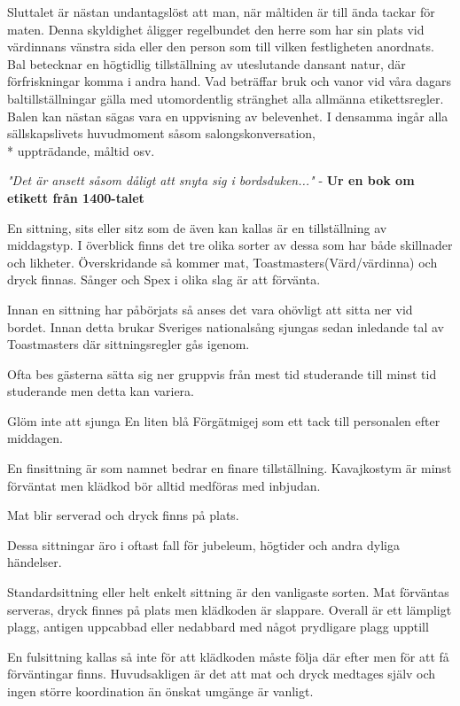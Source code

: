Sluttalet är nästan undantagslöst att man, när måltiden är till ända tackar för maten. Denna skyldighet åligger regelbundet den herre som har sin plats vid värdinnans vänstra sida eller den person som till vilken festligheten anordnats.
\filbreak
{}
Bal betecknar en högtidlig tillställning av uteslutande dansant natur, där förfriskningar komma i andra hand. Vad beträffar bruk och vanor vid våra dagars baltillställningar gälla med utomordentlig stränghet alla allmänna etikettsregler. Balen kan nästan sägas vara en uppvisning av belevenhet. I densamma ingår alla sällskapslivets huvudmoment såsom salongskonversation,\\* uppträdande, måltid osv.

\textit{"Det är ansett såsom dåligt att snyta sig i bordsduken..."} - \textbf{Ur en bok om etikett från 1400-talet}
\filbreak
{}

En sittning, sits eller sitz som de även kan kallas är en tillställning av middagstyp. I överblick finns det tre olika sorter av dessa som har både skillnader och likheter. Överskridande så kommer mat, Toastmasters(Värd/värdinna) och dryck finnas. Sånger och Spex i olika slag är att förvänta.

Innan en sittning har påbörjats så anses det vara ohövligt att sitta ner vid bordet. Innan detta brukar Sveriges nationalsång sjungas sedan inledande tal av Toastmasters där sittningsregler gås igenom.

Ofta bes gästerna sätta sig ner gruppvis från mest tid studerande till minst tid studerande men detta kan variera.

Glöm inte att sjunga En liten blå Förgätmigej som ett tack till personalen efter middagen.


En finsittning är som namnet bedrar en finare tillställning. Kavajkostym är minst förväntat men klädkod bör alltid medföras med inbjudan.

Mat blir serverad och dryck finns på plats.

Dessa sittningar äro i oftast fall för jubeleum, högtider och andra dyliga händelser.


Standardsittning eller helt enkelt sittning är den vanligaste sorten. Mat förväntas serveras, dryck finnes på plats men klädkoden är slappare. Overall är ett lämpligt plagg, antigen uppcabbad eller nedabbard med något prydligare plagg upptill


En fulsittning kallas så inte för att klädkoden måste följa där efter men för att få förväntingar finns. Huvudsakligen är det att mat och dryck medtages själv och ingen större koordination än önskat umgänge är vanligt.



\newpage